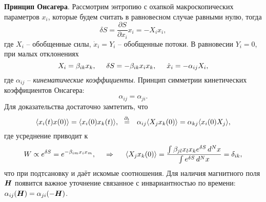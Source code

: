 



\textbf{Принцип Онсагера}. Рассмотрим энтропию с охапкой макроскопических параметров $x_i$, которые будем считать в равновесном случае равными нулю, тогда
\begin{equation*}
	\delta S = \frac{\partial S}{\partial x_i} x_i = -X_i x_i,
\end{equation*}
где $X_i$ -- обобщенные силы, $\dot{x}_i = Y_i$ -- обобщенные потоки.  В равновесии $Y_i = 0$, при малых отклонениях 
\begin{equation*}
	X_i = \beta_{ik} x_k,
	\hspace{5 mm} 
	\delta S = - \beta_{ik} x_i x_k,
	\hspace{5 mm} 
	\dot{x}_i = - \alpha_{ij} X_i,
\end{equation*}
где $\alpha_{ij}$ -- \textit{кинематические коэффициенты}. Принцип симметрии кинетических коэффициентов Онсагера:
\begin{equation*}
	\boxed{\alpha_{ij} = \alpha_{ji}}.
\end{equation*}
Для доказательства достаточно замтетить, что
\begin{equation*}
	\langle x_i (t) x(0)\rangle = \langle x_i (0) x_k (t) \rangle,
	\hspace{0.25cm} \overset{\partial_t}{=}  \hspace{0.25cm}
	\alpha_{ij} \langle X_j x_k(0)\rangle = \alpha_{kj} \langle x_i (0) X_j\rangle,
\end{equation*}
где усреднение приводит к
\begin{equation*}
	W \propto e^{\delta S} = e^{- \beta_{im} x_i x_m},
	\hspace{0.5 cm} \Rightarrow \hspace{0.5 cm}
	\langle X_j x_k (0)\rangle = \frac{
		\int  \beta_{jl} x_l x_k e^{\delta S} \, d^N x
	}{
		\int e^{\delta S} \, d^N x
	} = \delta_{ik},
\end{equation*}
что при подтсановку и даёт искомые соотношения. Для наличия магнитного поля $\boldsymbol{H}$ появится важное уточнение связанное с инвариантностью по времени: $\alpha_{ij} (\boldsymbol{H}) = \alpha_{ji} (-\boldsymbol{H})$. 